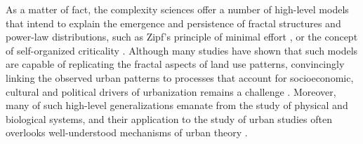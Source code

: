 \documentclass[10pt,letterpaper]{article}
\begin{document}
As a matter of fact, the complexity sciences offer a number of high-level models that intend to explain the emergence and persistence of fractal structures and power-law distributions, such as Zipf's principle of minimal effort \cite{zipf1949human}, or the concept of self-organized criticality \cite{bak1988self}.
Although many studies have shown that such models are capable of replicating the fractal aspects of land use patterns, convincingly linking the observed urban patterns to processes that account for socioeconomic, cultural and political drivers of urbanization remains a challenge \cite{batty2001modelling}. %
Moreover, many of such high-level generalizations emanate from the study of physical and biological systems, and their application to the study of urban studies often overlooks well-understood mechanisms of urban theory \cite{manson2006complexity}.
\end{document}
